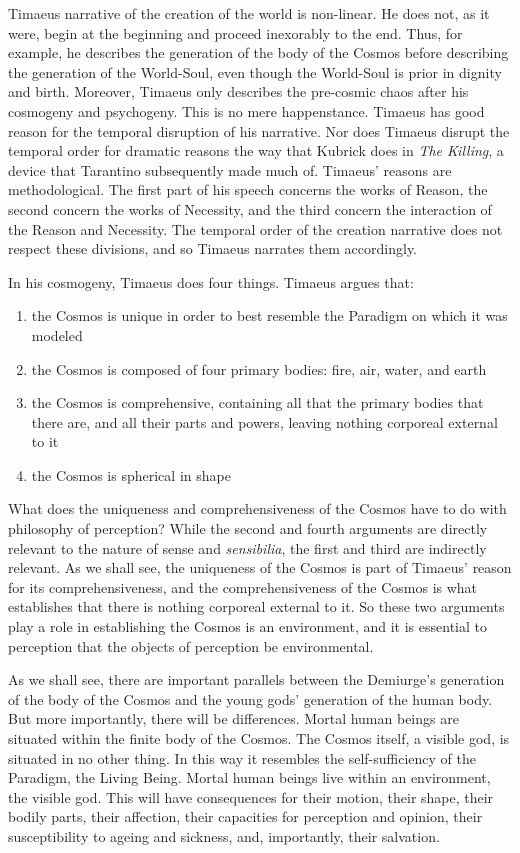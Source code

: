 Timaeus narrative of the creation of the world is non-linear. He does not, as it were, begin at the beginning and proceed inexorably to the end. Thus, for example, he describes the generation of the body of the Cosmos before describing the generation of the World-Soul, even though the World-Soul is prior in dignity and birth. Moreover, Timaeus only describes the pre-cosmic chaos after his cosmogeny and psychogeny. This is no mere happenstance. Timaeus has good reason for the temporal disruption of his narrative. Nor does Timaeus disrupt the temporal order for dramatic reasons the way that Kubrick does in \emph{The Killing}, a device that Tarantino subsequently made much of. Timaeus' reasons are methodological. The first part of his speech concerns the works of Reason, the second concern the works of Necessity, and the third concern the interaction of the Reason and Necessity. The temporal order of the creation narrative does not respect these divisions, and so Timaeus narrates them accordingly.

In his cosmogeny, Timaeus does four things. Timaeus argues that:
\begin{enumerate}[(1)]
	\item the Cosmos is unique in order to best resemble the Paradigm on which it was modeled
	\item the Cosmos is composed of four primary bodies: fire, air, water, and earth
	\item the Cosmos is comprehensive, containing all that the primary bodies that there are, and all their parts and powers, leaving nothing corporeal external to it
	\item the Cosmos is spherical in shape
\end{enumerate}
What does the uniqueness and comprehensiveness of the Cosmos have to do with philosophy of perception? While the second and fourth arguments are directly relevant to the nature of sense and \emph{sensibilia}, the first and third are indirectly relevant. As we shall see, the uniqueness of the Cosmos is part of Timaeus' reason for its comprehensiveness, and the comprehensiveness of the Cosmos is what establishes that there is nothing corporeal external to it. So these two arguments play a role in establishing the Cosmos is an environment, and it is essential to perception that the objects of perception be environmental.

As we shall see, there are important parallels between the Demiurge's generation of the body of the Cosmos and the young gods' generation of the human body. But more importantly, there will be differences. Mortal human beings are situated within the finite body of the Cosmos. The Cosmos itself, a visible god, is situated in no other thing. In this way it resembles the self-sufficiency of the Paradigm, the Living Being. Mortal human beings live within an environment, the visible god. This will have consequences for their motion, their shape, their bodily parts, their affection, their capacities for perception and opinion, their susceptibility to ageing and sickness, and, importantly, their salvation.


